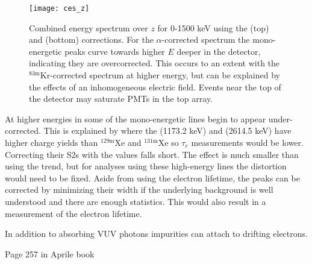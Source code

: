 \begin{figure}
\centering
\texttt{[image: ces\_z]}
\caption{Combined energy spectrum over $z$ for 0-1500 keV using the \alphadecay (top) and \metakr (bottom) \stwob corrections.  For the
$\alpha$-corrected spectrum the mono-energetic peaks curve towards higher $E$ deeper in the detector, indicating they are
overcorrected.  This occurs to an extent with the $\mathrm{^{83m}Kr}$-corrected spectrum at higher energy, but can be explained by the
effects of an inhomogeneous electric field.  Events near the top of the detector may saturate PMTs in the top array.}
\label{fig:elifetime_fit_kr_z_dependence}
\end{figure}

At higher energies in  some of the mono-energetic lines begin to appear under-corrected.  This
is explained by  where the  (1173.2 keV) and  (2614.5 keV)
have higher charge yields than $\mathrm{^{129m}Xe}$ and $\mathrm{^{131m}Xe}$ so $\tau_e$ measurements would be lower.  Correcting their
S2s with the \metakr values falls short.  The effect is much smaller than using the \alphadecay trend, but for analyses using these
high-energy lines the distortion would need to be fixed.  Aside from using the electron lifetime, the peaks can be corrected by minimizing
their width if the underlying background is well understood and there are enough statistics.  This would also result in a measurement of
the electron lifetime.

In addition to absorbing VUV photons impurities can attach to drifting electrons.






Page 257 in Aprile book